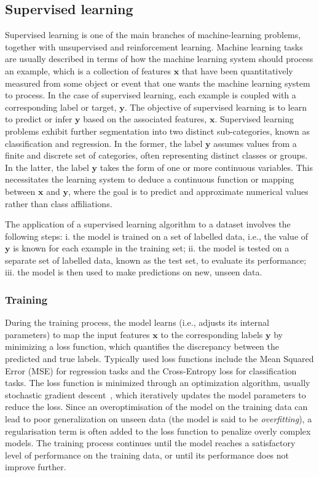 \subsection{Supervised learning}
Supervised learning is one of the main branches of machine-learning problems, together with unsupervised and reinforcement learning. Machine learning tasks are usually described in terms of how the machine learning system should process an example, which is a collection of features $\mathbf{x}$ that have been quantitatively measured from some object or event that one wants the machine learning system to process. In the case of supervised learning, each example is coupled with a corresponding label or target, $\mathbf{y}$. The objective of supervised learning is to learn to predict or infer $\mathbf{y}$ based on the associated features, $\mathbf{x}$.
Supervised learning problems exhibit further segmentation into two distinct sub-categories, known as classification and regression. In the former, the label $\mathbf{y}$ assumes values from a finite and discrete set of categories, often representing distinct classes or groups. In the latter, the label $\mathbf{y}$ takes the form of one or more continuous variables. This necessitates the learning system to deduce a continuous function or mapping between $\mathbf{x}$ and $\mathbf{y}$, where the goal is to predict and approximate numerical values rather than class affiliations.

The application of a supervised learning algorithm to a dataset involves the following steps: i. the model is trained on a set of labelled data, i.e., the value of $\mathbf{y}$ is known for each example in the training set; ii. the model is tested on a separate set of labelled data, known as the test set, to evaluate its performance; iii. the model is then used to make predictions on new, unseen data.

\subsubsection{Training}
During the training process, the model learns (i.e., adjusts its internal parameters) to map the input features $\mathbf{x}$ to the corresponding labels $\mathbf{y}$ by minimizing a loss function, which quantifies the discrepancy between the predicted and true labels. Typically used loss functions include the Mean Squared Error (MSE) for regression tasks and the Cross-Entropy loss for classification tasks. The loss function is minimized through an optimization algorithm, usually stochastic gradient descent~\cite{10.1214/aoms/1177729392}, which iteratively updates the model parameters to reduce the loss. Since an overoptimisation of the model on the training data can lead to poor generalization on unseen data (the model is said to be \emph{overfitting}), a regularisation term is often added to the loss function to penalize overly complex models. The training process continues until the model reaches a satisfactory level of performance on the training data, or until its performance does not improve further. 

